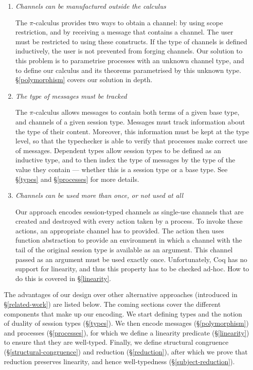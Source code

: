 \documentclass{mproj}
\newcommand{\picalc}{$\pi$-calculus}
\begin{document}
\begin{enumerate}
    \item \emph{Channels can be manufactured outside the calculus}

    The \picalc{} provides two ways to obtain a channel: by using scope restriction, and by receiving a message that contains a channel. The user must be restricted to using these constructs. If the type of channels is defined inductively, the user is not prevented from forging channels. Our solution to this problem is to parametrise processes with an unknown channel type, and to define our calculus and its theorems parametrised by this unknown type. \S \ref{polymorphism} covers our solution in depth.

    \item \emph{The type of messages must be tracked}

    The \picalc{} allows messages to contain both terms of a given base type, and channels of a given session type. Messages must track information about the type of their content. Moreover, this information must be kept at the type level, so that the typechecker is able to verify that processes make correct use of messages. Dependent types allow session types to be defined as an inductive type, and to then index the type of messages by the type of the value they contain --- whether this is a session type or a base type. See \S \ref{types} and \S \ref{processes} for more details.

    \item \emph{Channels can be used more than once, or not used at all}

    Our approach encodes session-typed channels as single-use channels that are created and destroyed with every action taken by a process. To invoke these actions, an appropriate channel has to provided. The action then uses function abstraction to provide an environment in which a channel with the tail of the original session type is available as an argument. This channel passed as an argument must be used exactly once. Unfortunately, Coq has no support for linearity, and thus this property has to be checked ad-hoc. How to do this is covered in \S \ref{linearity}.
\end{enumerate}

The advantages of our design over other alternative approaches (introduced in \S \ref{related-work}) are listed below. The coming sections cover the different components that make up our encoding. We start defining types and the notion of duality of session types (\S \ref{types}). We then encode messages (\S \ref{polymorphism}) and processes (\S \ref{processes}), for which we define a linearity predicate (\S \ref{linearity}) to ensure that they are well-typed. Finally, we define structural congruence (\S \ref{structural-congruence}) and reduction (\S \ref{reduction}), after which we prove that reduction preserves linearity, and hence well-typedness (\S \ref{subject-reduction}).
\end{document}
